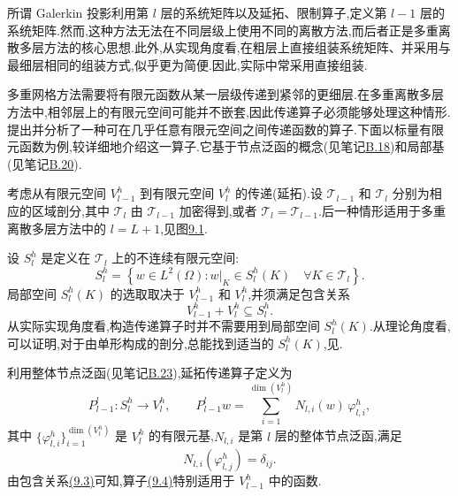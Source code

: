

\begin{note}[粗层线性系统的定义]
\label{note:chapter9-coarse-system-matrices}
所谓 Galerkin 投影利用第 $l$ 层的系统矩阵以及延拓、限制算子,定义第 $l-1$ 层的系统矩阵.然而,这种方法无法在不同层级上使用不同的离散方法,而后者正是多重离散多层方法的核心思想.此外,从实现角度看,在粗层上直接组装系统矩阵、并采用与最细层相同的组装方式,似乎更为简便.因此,实际中常采用直接组装.
\end{note}

\begin{note}[函数延拓]
\label{note:chapter9-function-prolongation}
多重网格方法需要将有限元函数从某一层级传递到紧邻的更细层.在多重离散多层方法中,相邻层上的有限元空间可能并不嵌套,因此传递算子必须能够处理这种情形.\textcite{Schieweck2000}提出并分析了一种可在几乎任意有限元空间之间传递函数的算子.下面以标量有限元函数为例,较详细地介绍这一算子.它基于节点泛函的概念(见笔记\hyperref[note:appendix-b-18]{B.18})和局部基(见笔记\hyperref[note:appendix-b-20]{B.20}).

考虑从有限元空间 $V_{l-1}^h$ 到有限元空间 $V_l^h$ 的传递(延拓).设 $\mathcal T_{l-1}$ 和 $\mathcal T_l$ 分别为相应的区域剖分,其中 $\mathcal T_l$ 由 $\mathcal T_{l-1}$ 加密得到,或者 $\mathcal T_l=\mathcal T_{l-1}$.后一种情形适用于多重离散多层方法中的 $l=L+1$,见图\hyperref[fig:chapter9-multigrid-approaches]{9.1}.

设 $S_l^h$ 是定义在 $\mathcal T_l$ 上的不连续有限元空间:
\[
 S_l^h=\left\{w\in L^2(\Omega):
     w|_K\in S_l^h(K)\quad\forall K\in\mathcal T_l\right\}.
\]
局部空间 $S_l^h(K)$ 的选取取决于 $V_{l-1}^h$ 和 $V_l^h$,并须满足包含关系
\begin{equation}\label{eq:chapter9-transfer-space-inclusion}
 V_{l-1}^h+V_l^h\subseteq S_l^h.
\end{equation}
从实际实现角度看,构造传递算子时并不需要用到局部空间 $S_l^h(K)$.从理论角度看,可以证明,对于由单形构成的剖分,总能找到适当的 $S_l^h(K)$,见\textcite{JohnKnoblochMatthiesTobiska2002}.

利用整体节点泛函(见笔记\hyperref[note:appendix-b-23]{B.23}),延拓传递算子定义为
\begin{equation}\label{eq:chapter9-function-prolongation}
 P_{l-1}^{l}:S_l^h\longrightarrow V_l^h,
 \qquad
 P_{l-1}^{l}w=\sum_{i=1}^{\dim(V_l^h)}N_{l,i}(w)\,\varphi_{l,i}^h,
\end{equation}
其中 $\{\varphi_{l,i}^h\}_{i=1}^{\dim(V_l^h)}$ 是 $V_l^h$ 的有限元基,$N_{l,i}$ 是第 $l$ 层的整体节点泛函,满足
\[
 N_{l,i}(\varphi_{l,j}^h)=\delta_{ij}.
\]
由包含关系\hyperref[eq:chapter9-transfer-space-inclusion]{(9.3)}可知,算子\hyperref[eq:chapter9-function-prolongation]{(9.4)}特别适用于 $V_{l-1}^h$ 中的函数.
\end{note}

